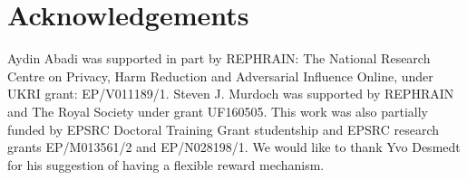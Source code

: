 

\section*{Acknowledgements}

Aydin Abadi was supported in part by REPHRAIN: The National Research Centre on Privacy, Harm Reduction and Adversarial Influence Online, under UKRI grant: EP/V011189/1. Steven J. Murdoch was supported by REPHRAIN and The Royal Society under grant UF160505. This work was also partially funded by EPSRC Doctoral Training Grant studentship and EPSRC research grants EP/M013561/2 and EP/N028198/1. We would like to thank Yvo Desmedt for his suggestion of having a flexible reward mechanism. 
